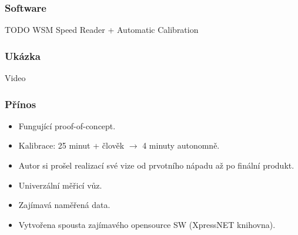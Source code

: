 \documentclass[aspectratio=169]{beamer}
\begin{document}

\begin{frame}
\frametitle{Software}
TODO WSM Speed Reader + Automatic Calibration
\end{frame}


\begin{frame}
\frametitle{Ukázka}
Video
\end{frame}


\begin{frame}
\frametitle{Přínos}
\begin{itemize}
\item Fungující proof-of-concept.
\item Kalibrace: 25 minut + člověk $\rightarrow$ 4 minuty autonomně.
\item Autor si prošel realizací své vize od prvotního nápadu až po finální produkt.
\item Univerzální měřicí vůz.
\item Zajímavá naměřená data.
\item Vytvořena spousta zajímavého opensource SW (XpressNET knihovna).
\end{itemize}
\end{frame}

\end{document}
